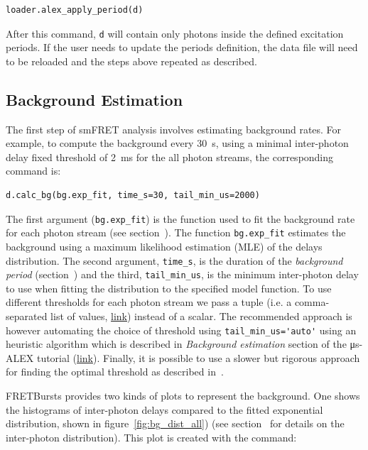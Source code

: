 \documentclass[10pt,letterpaper]{article}
\begin{document}
\begin{lstlisting}
loader.alex_apply_period(d)
\end{lstlisting}

After this command, \verb|d| will contain only photons inside the defined excitation periods.
If the user needs to update the periods definition, the data file will need to be
reloaded and the steps above repeated as described.


\subsection*{Background Estimation}
\label{sec:bg_calc}

The first step of smFRET analysis involves estimating background rates.
For example, to compute the background every 30~s, using a minimal inter-photon
delay fixed threshold of 2~ms for the all photon streams, the corresponding command is:

\begin{lstlisting}
d.calc_bg(bg.exp_fit, time_s=30, tail_min_us=2000)
\end{lstlisting}

The first argument (\verb|bg.exp_fit|) is the function used to fit the
background rate for each photon stream (see section~).
The function
\verb|bg.exp_fit| estimates the background using a maximum likelihood estimation
(MLE) of the delays distribution.
The second argument, \verb|time_s|, is the duration of the
\textit{background period} (section~) and the third, \verb|tail_min_us|,
is the minimum inter-photon delay to use when fitting the distribution to the specified model function.
To use different thresholds for each photon stream we pass a
tuple (i.e. a comma-separated list of values, \href{https://docs.python.org/3.5/tutorial/datastructures.html#tuples-and-sequences}{link}) instead of a scalar.
The recommended approach is however automating the choice of threshold using
\verb|tail_min_us='auto'| using an heuristic algorithm which is described in
\textit{Background estimation} section of the μs-ALEX tutorial
(\href{http://nbviewer.jupyter.org/github/tritemio/FRETBursts_notebooks/blob/master/notebooks/FRETBursts%20-%20us-ALEX%20smFRET%20burst%20analysis.ipynb#Background-estimation}{link}).
Finally, it is possible to use a slower but rigorous approach for finding the optimal
threshold as described in~. %

FRETBursts provides two kinds of plots to represent the background. One shows the histograms
of inter-photon delays compared to the fitted exponential distribution, shown in
figure~\ref{fig:bg_dist_all}) (see section~ for details on the inter-photon distribution).
This plot is created with the command:
\end{document}
